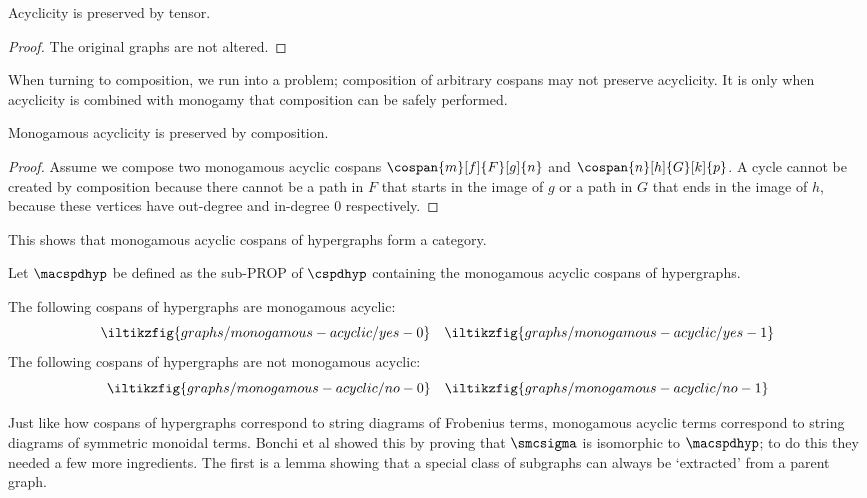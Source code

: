 \begin{lemma}\label{lem:monogamous-acyclicity-preserved-tensor}
    Acyclicity is preserved by tensor.
\end{lemma}
\begin{proof}
    The original graphs are not altered.
\end{proof}

When turning to composition, we run into a problem; composition of arbitrary
cospans may not preserve acyclicity.
It is only when acyclicity is combined with monogamy that composition can be
safely performed.

\begin{lemma}\label{lem:monogamous-acyclicity-preserved-composition}
    Monogamous acyclicity is preserved by composition.
\end{lemma}
\begin{proof}
    Assume we compose two monogamous acyclic cospans \(
    \cospan{m}[f]{F}[g]{n}
    \) and \(
    \cospan{n}[h]{G}[k]{p}
    \).
    A cycle cannot be created by composition because there cannot be a path in
    \(F\) that starts in the image of \(g\) or a path in \(G\) that ends in the
    image of \(h\), because these vertices have out-degree and in-degree \(0\)
    respectively.
\end{proof}

This shows that monogamous acyclic cospans of hypergraphs form a category.

\begin{definition}
    Let \(\macspdhyp\) be defined as the sub-PROP of \(\cspdhyp\) containing the
    monogamous acyclic cospans of hypergraphs.
\end{definition}

\begin{example}\label{ex:monogamous-acyclic}
    The following cospans of hypergraphs are monogamous acyclic:
    \[
        \iltikzfig{graphs/monogamous-acyclic/yes-0}
        \quad
        \iltikzfig{graphs/monogamous-acyclic/yes-1}
    \]
    The following cospans of hypergraphs are not monogamous acyclic:
    \[
        \iltikzfig{graphs/monogamous-acyclic/no-0}
        \quad
        \iltikzfig{graphs/monogamous-acyclic/no-1}
    \]
\end{example}

Just like how cospans of hypergraphs correspond to string diagrams of Frobenius
terms, monogamous acyclic terms correspond to string diagrams of symmetric
monoidal terms.
Bonchi et al showed this by proving that \(\smcsigma\) is isomorphic to
\(\macspdhyp\); to do this they needed a few more ingredients.
The first is a lemma showing that a special class of subgraphs can always be
`extracted' from a parent graph.

